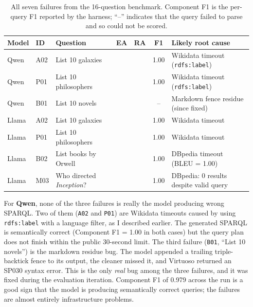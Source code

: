 \documentclass[11pt,a4paper]{article}
\newcommand{\cmark}{\ding{51}}%
\newcommand{\xmark}{\ding{55}}%
\begin{document}
\begin{table}[H]
    \centering
    \small
    \begin{tabularx}{\linewidth}{l l X c c c X}
        \toprule
        \textbf{Model} & \textbf{ID} & \textbf{Question}
            & \textbf{EA} & \textbf{RA} & \textbf{F1}
            & \textbf{Likely root cause} \\
        \midrule
        Qwen   & A02 & List 10 galaxies
               & \xmark & \xmark & 1.00
               & Wikidata timeout (\texttt{rdfs:label}) \\
        Qwen   & P01 & List 10 philosophers
               & \xmark & \xmark & 1.00
               & Wikidata timeout (\texttt{rdfs:label}) \\
        Qwen   & B01 & List 10 novels
               & \xmark & \xmark & --
               & Markdown fence residue (since fixed) \\
        Llama  & A02 & List 10 galaxies
               & \xmark & \xmark & 1.00
               & Wikidata timeout \\
        Llama  & P01 & List 10 philosophers
               & \xmark & \xmark & 1.00
               & Wikidata timeout \\
        Llama  & B02 & List books by Orwell
               & \xmark & \xmark & 1.00
               & DBpedia timeout (BLEU = 1.00) \\
        Llama  & M03 & Who directed \emph{Inception}?
               & \cmark & \xmark & 1.00
               & DBpedia: 0 results despite valid query \\
        \bottomrule
    \end{tabularx}
    \caption{All seven failures from the 16-question benchmark.
    Component F1 is the per-query F1 reported by the harness;
    ``--'' indicates that the query failed to parse and so could not
    be scored.}
    \label{tab:failures}
\end{table}

For \textbf{Qwen}, none of the three failures is really the model
producing wrong SPARQL. Two of them (\texttt{A02} and \texttt{P01})
are Wikidata timeouts caused by using \texttt{rdfs:label} with a
language filter, as I described earlier. The generated SPARQL is
semantically correct (Component F1 = 1.00 in both cases) but the
query plan does not finish within the public 30-second limit. The
third failure (\texttt{B01}, ``List 10 novels'') is the markdown
residue bug. The model appended a trailing triple-backtick fence to
its output, the cleaner missed it, and Virtuoso returned an SP030
syntax error. This is the only \emph{real} bug among the three
failures, and it was fixed during the evaluation iteration. Component
F1 of 0.979 across the run is a good sign that the model is producing
semantically correct queries; the failures are almost entirely
infrastructure problems.
\end{document}
